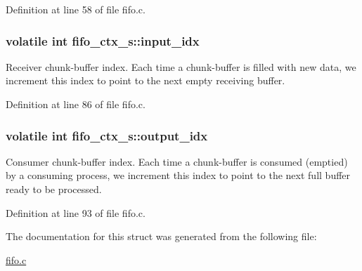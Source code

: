 Definition at line 58 of file fifo.\+c.

\subsubsection[{\texorpdfstring{input\+\_\+idx}{input_idx}}]{\setlength{\rightskip}{0pt plus 5cm}volatile int fifo\+\_\+ctx\+\_\+s\+::input\+\_\+idx}\hypertarget{structfifo__ctx__s_aa5c17b3a497d655710243cb2c14ef1bf}{}\label{structfifo__ctx__s_aa5c17b3a497d655710243cb2c14ef1bf}
Receiver chunk-\/buffer index. Each time a chunk-\/buffer is filled with new data, we increment this index to point to the next empty receiving buffer. 

Definition at line 86 of file fifo.\+c.

\subsubsection[{\texorpdfstring{output\+\_\+idx}{output_idx}}]{\setlength{\rightskip}{0pt plus 5cm}volatile int fifo\+\_\+ctx\+\_\+s\+::output\+\_\+idx}\hypertarget{structfifo__ctx__s_a28fca425f183a3add55c94dcdc5c04e0}{}\label{structfifo__ctx__s_a28fca425f183a3add55c94dcdc5c04e0}
Consumer chunk-\/buffer index. Each time a chunk-\/buffer is consumed (emptied) by a consuming process, we increment this index to point to the next full buffer ready to be processed. 

Definition at line 93 of file fifo.\+c.



The documentation for this struct was generated from the following file\+:\begin{DoxyCompactItemize}
\item 
\hyperlink{fifo_8c}{fifo.\+c}\end{DoxyCompactItemize}
